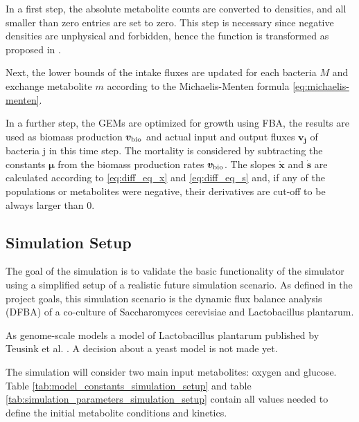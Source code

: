 In a first step, the absolute metabolite counts are converted to densities, and all smaller than zero entries are set to zero. This step is necessary since negative densities are unphysical and forbidden, hence the function is transformed as proposed in \cite{shampine_nonneg_2005}.

Next, the lower bounds of the intake fluxes are updated for each bacteria $M$ and exchange metabolite $m$ according to the Michaelis-Menten formula \ref{eq:michaelis-menten}.

In a further step, the GEMs are optimized for growth using FBA, the results are used as biomass production $\bm{v}_{\mathrm{bio}}$ and actual input and output
fluxes $\bm{v_j}$ of bacteria j in this time step.
The mortality is considered by subtracting the constants $\bm{\mu}$ from the biomass production rates $\bm{v}_{\mathrm{bio}}$.
The slopes $\dot{\bm{x}}$ and $\bm{\dot{s}}$ are calculated according to \ref{eq:diff_eq_x} and \ref{eq:diff_eq_s} and, if any of the populations or metabolites were negative, their derivatives are cut-off to be always larger than 0.

\subsection{Simulation Setup}\label{ssec:simulation_setup}

The goal of the simulation is to validate the basic functionality of the simulator using a simplified setup of a realistic future
simulation scenario. As defined in the project goals, this simulation scenario is the dynamic flux balance analysis (DFBA) of a
co-culture of Saccharomyces cerevisiae and Lactobacillus plantarum.

As genome-scale models a model of Lactobacillus plantarum published by Teusink et al. \cite{teusink_analysis_2006}. A decision about
a yeast model is not made yet.

The simulation will consider two main input metabolites: oxygen and glucose. Table \ref{tab:model_constants_simulation_setup} and table
\ref{tab:simulation_parameters_simulation_setup} contain all values needed to define the initial metabolite conditions and kinetics.

